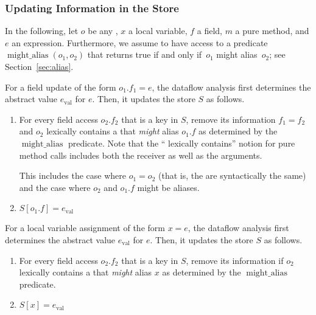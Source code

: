 \subsubsection{Updating Information in the Store}

\newcommand{\alias}{\operatorname{might\_alias}}

In the following, let $o$ be any ,
$x$ a local variable, $f$ a
field, $m$ a pure method, and $e$ an expression.  Furthermore, we assume to have access to
a predicate $\alias(o_1,o_2)$ that returns true if and only
if~$o_1$ might alias~$o_2$; see Section~\ref{sec:alias}.


For a field update of the form $o_1.f_1 = e$, the
dataflow analysis first determines the abstract value $e_\text{val}$ for $e$.
Then, it updates the store $S$ as follows.
\begin{enumerate}
    \item For every field access $o_2.f_2$ that is a key in $S$, remove its
      information $f_1 = f_2$ and 
      $o_2$ lexically contains a  that \emph{might}
        alias $o_1.f$ as determined by the $\alias$
        predicate.
      Note that the `` lexically contains'' notion for pure method calls
        includes both the receiver as well as the arguments.

      This includes the case where $o_1 = o_2$ (that is, the are
      syntactically the same) and the case where  $o_2$ and $o_1.f$ might be
      aliases.

    \item $S[o_1.f] = e_\text{val}$
\end{enumerate}



For a local variable assignment of the form $x = e$,
the dataflow analysis first determines the abstract value $e_\text{val}$ for
$e$.
Then, it updates the store $S$ as follows.
\begin{enumerate}
    \item For every field access $o_2.f_2$ that is a key in $S$, remove its information if
    $o_2$ lexically contains a  that \emph{might}
    alias $x$ as determined by the $\alias$
    predicate.
    \item $S[x] = e_\text{val}$
\end{enumerate}


